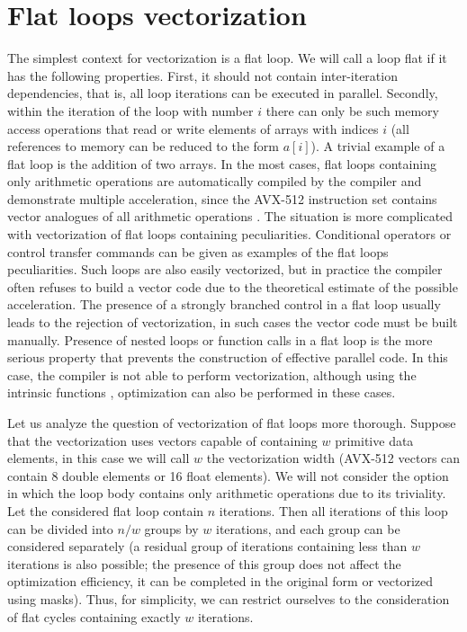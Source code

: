 \documentclass[
11pt,%
tightenlines,%
twoside,%
onecolumn,%
nofloats,%
nobibnotes,%
nofootinbib,%
superscriptaddress,%
noshowpacs,%
centertags]%
{revtex4}
\begin{document}
\section{Flat loops vectorization}

The simplest context for vectorization is a flat loop.
We will call a loop flat if it has the following properties.
First, it should not contain inter-iteration dependencies, that is, all loop iterations can be executed in parallel.
Secondly, within the iteration of the loop with number $i$ there can only be such memory access operations that read or write elements of arrays with indices $i$ (all references to memory can be reduced to the form $a[i]$).
A trivial example of a flat loop is the addition of two arrays.
In the most cases, flat loops containing only arithmetic operations are automatically compiled by the compiler and demonstrate multiple acceleration, since the AVX-512 instruction set contains vector analogues of all arithmetic operations \cite{Intel_SDM}.
The situation is more complicated with vectorization of flat loops containing peculiarities.
Conditional operators or control transfer commands can be given as examples of the flat loops peculiarities.
Such loops are also easily vectorized, but in practice the compiler often refuses to build a vector code due to the theoretical estimate of the possible acceleration.
The presence of a strongly branched control in a flat loop usually leads to the rejection of vectorization, in such cases the vector code must be built manually.
Presence of nested loops or function calls in a flat loop is the more serious property that prevents the construction of effective parallel code.  
In this case, the compiler is not able to perform vectorization, although using the intrinsic functions \cite{Intel_C,Intel_Intr}, optimization can also be performed in these cases.

Let us analyze the question of vectorization of flat loops more thorough.
Suppose that the vectorization uses vectors capable of containing $w$ primitive data elements, in this case we will call $w$ the vectorization width (AVX-512 vectors can contain 8 double elements or 16 float elements).
We will not consider the option in which the loop body contains only arithmetic operations due to its triviality.
Let the considered flat loop contain $n$ iterations.
Then all iterations of this loop can be divided into $n / w$ groups by $w$ iterations, and each group can be considered separately (a residual group of iterations containing less than $w$ iterations is also possible; the presence of this group does not affect the optimization efficiency, it can be completed in the original form or vectorized using masks).
Thus, for simplicity, we can restrict ourselves to the consideration of flat cycles containing exactly $w$ iterations.
\end{document}
